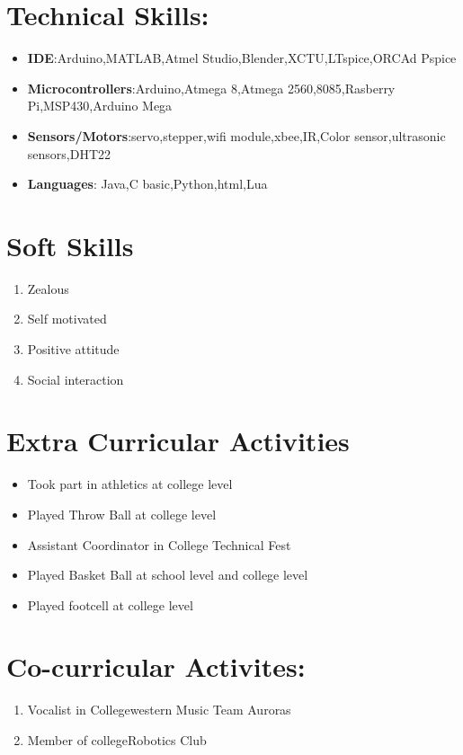 \documentclass[11pt]{article}
\begin{document}
\section{Technical Skills:}
\begin{itemize}

\item\textbf {IDE}:Arduino,MATLAB,Atmel Studio,Blender,XCTU,LTspice,ORCAd Pspice
 \item\textbf{ Microcontrollers}:Arduino,Atmega 8,Atmega 2560,8085,Rasberry Pi,MSP430,Arduino Mega
\item\textbf{ Sensors/Motors}:servo,stepper,wifi module,xbee,IR,Color sensor,ultrasonic sensors,DHT22
\item\textbf{ Languages}: Java,C basic,Python,html,Lua
 \end{itemize}
\section{Soft Skills}
\begin{enumerate}
\item Zealous
\item Self motivated
\item Positive attitude
\item Social interaction
\end{enumerate}
\section{Extra Curricular Activities}
\begin{itemize}
\item Took part in athletics at college level
\item Played Throw Ball at college level
\item Assistant Coordinator in College Technical Fest
\item Played Basket Ball at school level and college level
\item Played footcell at college level \\
\end{itemize}
\section{Co-curricular Activites:}
\begin{enumerate}
\item Vocalist in College{western Music Team Auroras}
\item Member of college{Robotics Club}
\end{enumerate}
\end{document}
